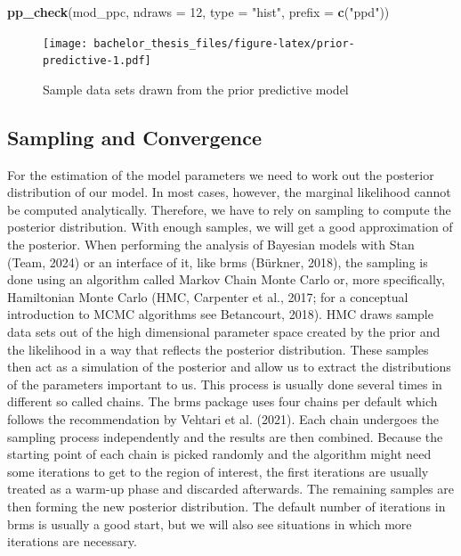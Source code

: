 \documentclass[
  doc,12pt,floatsintext]{apa7}
\newenvironment{Shaded}{\begin{snugshade}}{\end{snugshade}}
\newcommand{\AttributeTok}[1]{\textcolor[rgb]{0.13,0.29,0.53}{#1}}
\newcommand{\DecValTok}[1]{\textcolor[rgb]{0.00,0.00,0.81}{#1}}
\newcommand{\FunctionTok}[1]{\textcolor[rgb]{0.13,0.29,0.53}{\textbf{#1}}}
\newcommand{\NormalTok}[1]{#1}
\newcommand{\StringTok}[1]{\textcolor[rgb]{0.31,0.60,0.02}{#1}}
\begin{document}
\begin{Shaded}
\begin{Highlighting}[]
\FunctionTok{pp\_check}\NormalTok{(mod\_ppc, }\AttributeTok{ndraws =} \DecValTok{12}\NormalTok{, }\AttributeTok{type =} \StringTok{"hist"}\NormalTok{, }\AttributeTok{prefix =} \FunctionTok{c}\NormalTok{(}\StringTok{"ppd"}\NormalTok{))}
\end{Highlighting}
\end{Shaded}

\begin{figure}
\centering
\texttt{[image: bachelor\_thesis\_files/figure-latex/prior-predictive-1.pdf]}
\caption{\label{fig:prior-predictive}Sample data sets drawn from the prior predictive model}
\end{figure}

\subsection{Sampling and Convergence}\label{sampling-and-convergence}

For the estimation of the model parameters we need to work out the posterior distribution of our model. In most cases, however, the marginal likelihood cannot be computed analytically. Therefore, we have to rely on sampling to compute the posterior distribution. With enough samples, we will get a good approximation of the posterior. When performing the analysis of Bayesian models with Stan (Team, 2024) or an interface of it, like brms (Bürkner, 2018), the sampling is done using an algorithm called Markov Chain Monte Carlo or, more specifically, Hamiltonian Monte Carlo (HMC, Carpenter et al., 2017; for a conceptual introduction to MCMC algorithms see Betancourt, 2018). HMC draws sample data sets out of the high dimensional parameter space created by the prior and the likelihood in a way that reflects the posterior distribution. These samples then act as a simulation of the posterior and allow us to extract the distributions of the parameters important to us. This process is usually done several times in different so called chains. The brms package uses four chains per default which follows the recommendation by Vehtari et al. (2021). Each chain undergoes the sampling process independently and the results are then combined. Because the starting point of each chain is picked randomly and the algorithm might need some iterations to get to the region of interest, the first iterations are usually treated as a warm-up phase and discarded afterwards. The remaining samples are then forming the new posterior distribution. The default number of iterations in brms is usually a good start, but we will also see situations in which more iterations are necessary.
\end{document}
